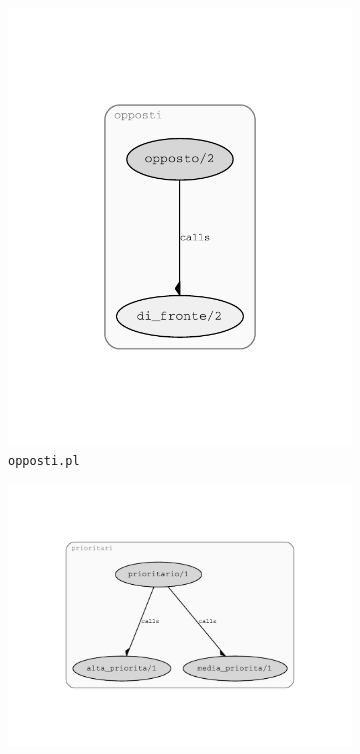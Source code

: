 \begin{figure}
\begin{subfigure}[b]{.4\textwidth}
		\includegraphics[width=\textwidth]{diagrams/opposti}
		\caption{\texttt{opposti.pl}}
	\end{subfigure}
	\begin{subfigure}[b]{.4\textwidth}
		\includegraphics[width=\textwidth]{diagrams/prioritari}

\end{subfigure}
\end{figure}
